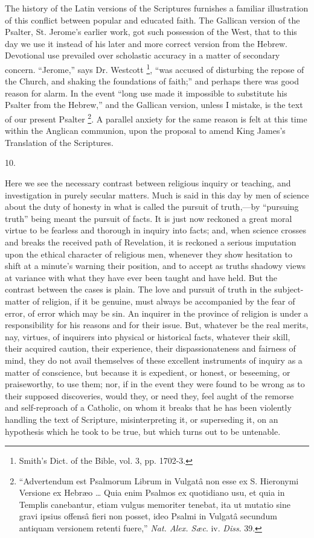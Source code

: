 The history of the Latin versions of the Scriptures furnishes a
familiar illustration of this conflict between popular and educated
faith. The Gallican version of the Psalter, St. Jerome's earlier work,
got such possession of the West, that to this day we use it instead of
his later and more correct version from the Hebrew. Devotional use
prevailed over scholastic accuracy in a matter of secondary concern.
``Jerome,'' says Dr. Westcott \footnote{Smith's Dict. of the Bible, vol. 3, pp.
1702-3.}, ``was accused of disturbing the repose of the Church, and
shaking the foundations of faith;'' and perhaps there was good reason for alarm. In the event ``long use made it impossible
to substitute his Psalter from the Hebrew,'' and the Gallican
version, unless I mistake, is the text of our present Psalter \footnote{``Advertendum est Psalmorum Librum in
Vulgatâ non esse ex S. Hieronymi Versione ex Hebræo … Quia enim
Psalmos ex quotidiano usu, et quia in Templis canebantur, etiam vulgus
memoriter tenebat, ita ut mutatio sine gravi ipsius offensâ fieri non
posset, ideo Psalmi in Vulgatâ secundum antiquam versionem retenti
fuere,'' \emph{Nat. Alex. Sæc}. iv. \emph{Diss}. 39.}. A parallel anxiety for the same reason is felt at this time
within the Anglican communion, upon the proposal to amend King James's
Translation of the Scriptures.

10.

Here we see the necessary contrast between religious inquiry or
teaching, and investigation in purely secular matters. Much is said in
this day by men of science about the duty of honesty in what is called
the pursuit of truth,—by ``pursuing truth'' being meant the
pursuit of facts. It is just now reckoned a great moral virtue to be
fearless and thorough in inquiry into facts; and, when science crosses
and breaks the received path of Revelation, it is reckoned a serious
imputation upon the ethical character of religious men, whenever they
show hesitation to shift at a minute's warning their position, and to
accept as truths shadowy views at variance with what they have
ever been taught and have held. But the contrast between the cases is
plain. The love and pursuit of truth in the subject-matter of
religion, if it be genuine, must always be accompanied by the fear of
error, of error which may be sin. An inquirer in the province of
religion is under a responsibility for his reasons and for their
issue. But, whatever be the real merits, nay, virtues, of inquirers
into physical or historical facts, whatever their skill, their
acquired caution, their experience, their dispassionateness and
fairness of mind, they do not avail themselves of these excellent
instruments of inquiry as a matter of conscience, but because it is
expedient, or honest, or beseeming, or praiseworthy, to use them; nor,
if in the event they were found to be wrong as to their supposed
discoveries, would they, or need they, feel aught of the remorse and
self-reproach of a Catholic, on whom it breaks that he has been
violently handling the text of Scripture, misinterpreting it, or
superseding it, on an hypothesis which he took to be true, but which
turns out to be untenable.

